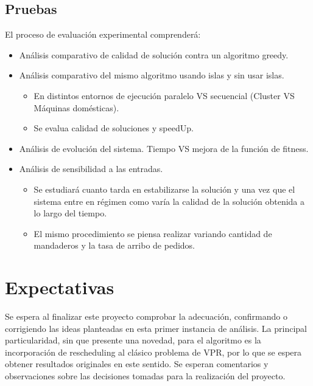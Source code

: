 \documentclass[9pt,conference]{IEEEtran}
\begin{document}
	\subsection{Pruebas}

		El proceso de evaluación experimental comprenderá:
		\begin{itemize}
			\item
			Análisis comparativo de calidad de solución contra un algoritmo greedy.
			\item
			Análisis comparativo del mismo algoritmo usando islas y sin usar islas.
			\begin{itemize}
				\item
				En distintos entornos de ejecución paralelo VS secuencial (Cluster VS Máquinas domésticas).
				\item
				Se evalua calidad de soluciones y speedUp.
			\end{itemize}
			\item
			Análisis de evolución del sistema. Tiempo VS mejora de la función de fitness.
			\item
			Análisis de sensibilidad a las entradas.
			\begin{itemize}
				\item
				Se estudiará cuanto tarda en estabilizarse la solución y una vez que el sistema entre en régimen como varía la calidad de la solución obtenida a lo largo del tiempo.
				\item
				El mismo procedimiento se piensa realizar variando cantidad de mandaderos y la tasa de arribo de pedidos.
			\end{itemize}
		\end{itemize}

	\section{Expectativas}
		Se espera al finalizar este proyecto comprobar la adecuación, confirmando o corrigiendo las ideas planteadas en esta primer instancia de análisis.
		La principal particularidad, sin que presente una novedad, para el algoritmo es la incorporación de rescheduling al clásico problema de VPR, por lo que se espera obtener resultados originales en este sentido.
		Se esperan comentarios y observaciones sobre las decisiones tomadas para la realización del proyecto.\\

	
	{}
\end{document}
